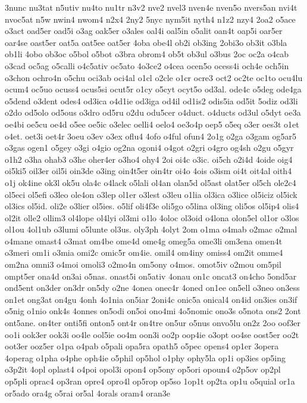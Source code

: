 {3nunc
nu3tat
n5utiv
nu4to
nu1tr
n3v2
nve2
nvel3
nven4e
nven5o
nvers5an
nvi4t
nvoc5at
n5w
nwin4
nwom4
n2x4
2ny2
5nyc
nym5it
nyth4
n1z2
nzy4
2oa2
o5ace
o3act
oad5er
oad5i
o3ag
oak5er
o3ales
oal4i
oal5in
o5alit
oan4t
oap5i
oar5er
oar4se
oast5er
oat5a
oat5ee
oat5er
4oba
obe4l
ob2i
ob3ing
2obi3o
ob3it
o3bla
ob1li
4obo
ob3oc
o5bol
o5bot
o3bra
obrom4
ob5t
ob3ul
o3bus
2oc
oc2a
o4cab
o3cad
oc5ag
o5calli
o4c5ativ
oc5ato
4o3ce2
o4cea
ocen5o
ocess4i
och4e
och5in
o3chon
ochro4n
o5chu
oci3ab
oci4al
o1cl
o2cle
o1cr
ocre3
oct2
oc2te
oc1to
ocu4lu
ocum4
oc5uo
ocuss4
ocus5si
ocut5r
o1cy
o5cyt
ocyt5o
od3al.
ode4c
o5deg
ode4ga
o5dend
o3dent
odes4
od3ica
o4d1ie
od3iga
od4il
od1is2
odis5ia
od5it
5odiz
od3li
o2do
od5olo
od5ous
o3dro
od5ru
o2du
odu5cer
o4duct.
o4ducts
od3ul
o5dyt
oe3a
oe4bi
oe5cu
oe4d
o5ee
oe5ic
o3elec
oelli4
oelo4
oe3o4p
oep5
o5eq
o3er
oes3t
o1et
o4et.
oet3i
oet4r
3oeu
o3ev
o3ex
oflu4
4ofo
o4ful
ofun4
2o1g
o2ga
o3gam
og5ar5
o3gas
ogen1
o5gey
o3gi
o4gio
og2na
ogoni4
o4got
o2gri
o4gro
og4sh
o2gu
o5gyr
o1h2
o3ha
ohab3
o3he
oher4er
o3ho4
ohy4
2oi
oi4c
o3ic.
oi5ch
o2i4d
4oide
oig4
oi5ki5
oil3er
oil5i
oin3de
o3ing
oin4t5er
oin4tr
oi4o
4ois
o3ism
oi4t
oit4al
oith4
o1j
ok4ine
ok3l
ok5u
ola4c
o4lack
o5lali
ol4an
olan5d
ol5ast
olat5er
ol5ch
ole2c4
ol5eci
ol5efi
o3leo
ole4on
o3lep
ol1er
o3lest
o3leu
o1lia
ol3ica
o3lice
ol5iciz
ol5ick
ol3ics
ol5id.
oli2e
o3lier
ol5ies.
o5lif
oli4f3e
oli5go
o5lina
ol3ing
oli5os
ol5ip4
olis4
ol2it
olle2
ollim3
ol4lope
ol4lyi
ol3mi
o1lo
4oloc
ol3oid
o4lona
olon5el
ol1or
o3los
ol1ou
4ol1ub
o3lumi
o5lunte
ol3us.
oly3ph
4olyt
2om
o1ma
o4mab
o2mac
o2mal
o4mane
omast4
o3mat
om4be
ome4d
ome4g
omeg5a
ome3li
om3ena
omen4t
o3meri
om1i
o3mia
omi2c
omic5r
om4ie.
omil4
om4iny
omiss4
om2it
omme4
om2na
omni3
o4moi
omoli3
o2mo4n
om5ony
o4mos.
omot5iv
o2mou
om5pil
ompt5er
ona4d
on3ai
o5nas.
onast5i
on5ativ
4onau
on1c
oncat3
on4cho
5ond5ar
ond5ent
on3der
on3dr
on5dy
o2ne
4onea
onec4r
4oned
on1ee
on5ell
o3neo
on3ess
on1et
ong3at
on4gu
4onh
4o1nia
on5iar
2oni4c
onic5a
onical4
on4id
on3ies
on3if
o5nig
o1nio
onk4s
4onnes
on5odi
on5oi
ono4mi
4o5nomic
ono3s
o5nota
ons2
2ont
ont5ane.
on4ter
onti5fi
onton5
ont4r
on4tre
on5ur
o5nus
onvo5lu
on2z
2oo
oof3er
oo1i
ook3er
ook3i
oo4le
ool5ie
oo4m
oon3i
oo2p
oop4ie
o3opt
oo4se
oost5er
oo2t
oot3er
ooz5er
o1pa
o4pab
o5pali
opa5ra
opath5
o5pec
opens4
op1er
3opera
4operag
o1pha
o4phe
oph4ie
o5phil
op5hol
o1phy
ophy5la
op1i
op3ies
op5ing
o3p2it
4opl
oplast4
o4poi
opol3i
opon4
op5ony
op5ori
opoun4
o2p5ov
op2pl
op5pli
oprac4
op3ran
opre4
opro4l
op5rop
op5so
1op1t
op2ta
op1u
o5quial
or1a
or5ado
ora4g
o5rai
or5al
4orals
oram4
oran3e
}
